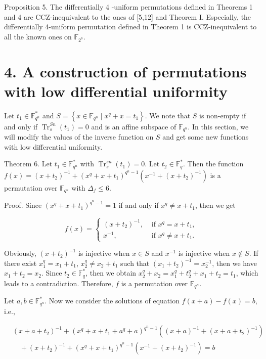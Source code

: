 \documentclass[10pt]{article}
\begin{document}
Proposition 5. The differentially 4 -uniform permutations defined in Theorems 1 and 4 are CCZ-inequivalent to the ones of [5,12] and Theorem I. Especially, the differentially 4-uniform permutation defined in Theorem 1 is CCZ-inequivalent to all the known ones on $\mathbb{F}_{2^{8}}$.

\section*{4. A construction of permutations with low differential uniformity}
Let $t_{1} \in \mathbb{F}_{q^{n}}^{*}$ and $S=\left\{x \in \mathbb{F}_{q^{n}} \mid x^{q}+x=t_{1}\right\}$. We note that $S$ is non-empty if and only if $\operatorname{Tr}_{s}^{S n}\left(t_{1}\right)=0$ and is an affine subspace of $\mathbb{F}_{q^{n}}$. In this section, we will modify the values of the inverse function on $S$ and get some new functions with low differential uniformity.

Theorem 6. Let $t_{1} \in \mathbb{F}_{q^{n}}^{*}$ with $\operatorname{Tr}_{s}^{s n}\left(t_{1}\right)=0$. Let $t_{2} \in \mathbb{F}_{q}^{*}$. Then the function $f(x)=\left(x+t_{2}\right)^{-1}+\left(x^{q}+x+\right. \left.t_{1}\right)^{q^{n}-1}\left(x^{-1}+\left(x+t_{2}\right)^{-1}\right)$ is a permutation over $\mathbb{F}_{q^{n}}$ with $\Delta_{f} \leqslant 6$.

Proof. Since $\left(x^{q}+x+t_{1}\right)^{q^{n}-1}=1$ if and only if $x^{q} \neq x+t_{1}$, then we get

$$
f(x)= \begin{cases}\left(x+t_{2}\right)^{-1}, & \text { if } x^{q}=x+t_{1}, \\ x^{-1}, & \text { if } x^{q} \neq x+t_{1} .\end{cases}
$$

Obviously, $\left(x+t_{2}\right)^{-1}$ is injective when $x \in S$ and $x^{-1}$ is injective when $x \notin S$. If there exist $x_{1}^{q}=x_{1}+t_{1}$, $x_{2}^{q} \neq x_{2}+t_{1}$ such that $\left(x_{1}+t_{2}\right)^{-1}=x_{2}^{-1}$, then we have $x_{1}+t_{2}=x_{2}$. Since $t_{2} \in \mathbb{F}_{q}^{*}$, then we obtain $x_{2}^{q}+x_{2}=x_{1}^{q}+t_{2}^{q}+x_{1}+t_{2}=t_{1}$, which leads to a contradiction. Therefore, $f$ is a permutation over $\mathbb{F}_{q^{n}}$.

Let $a, b \in \mathbb{F}_{q^{n}}^{*}$. Now we consider the solutions of equation $f(x+a)-f(x)=b$, i.e.,


\begin{align*}
& \left(x+a+t_{2}\right)^{-1}+\left(x^{q}+x+t_{1}+a^{q}+a\right)^{q^{n}-1}\left((x+a)^{-1}+\left(x+a+t_{2}\right)^{-1}\right) \\
& \quad+\left(x+t_{2}\right)^{-1}+\left(x^{q}+x+t_{1}\right)^{q^{n}-1}\left(x^{-1}+\left(x+t_{2}\right)^{-1}\right)=b \tag{16}
\end{align*}
\end{document}
